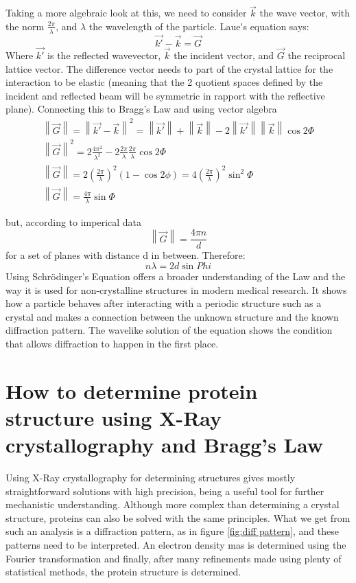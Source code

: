 \documentclass[14pt]{article}
\newcommand{\norm}[1]{\left\lVert#1\right\rVert}
\begin{document}
Taking a more algebraic look at this, we need to consider $\vec{k}$ the wave vector, with the norm $\frac{2\pi}{\lambda}$, and $\lambda$ the wavelength of the particle. \gls{Laue's equation} says: 
$$\vec{k'}-\vec{k}=\vec{G}$$
Where $\vec{k'}$ is the reflected wavevector, $\vec{k}$ the incident vector, and $\vec{G}$ the reciprocal lattice vector. The difference vector needs to part of the crystal lattice for the interaction to be elastic (meaning that the 2 quotient spaces defined by the incident and reflected beam will be symmetric in rapport with the reflective plane). Connecting this to Bragg’s Law and using vector algebra 
\begin{gather*}
    \norm{\vec{G}}=\norm{\vec{k'}-\vec{k}}^2=\norm{\vec{k'}}+\norm{\vec{k}}-2\norm{\vec{k'}}\norm{\vec{k}}\cos{2\Phi} \\
    \norm{\vec{G}}^2=2\frac{4\pi^2}{\lambda^2}-2\frac{2\pi}{\lambda}\frac{2\pi}{\lambda}\cos{2\Phi}\\
    \norm{\vec{G}}=2\left(\frac{2\pi}{\lambda}\right)^2(1-\cos{2\phi})=4\left(\frac{2\pi}{\lambda}\right)^2\sin^2{\Phi}\\
    \norm{\vec{G}}=\frac{4\pi}{\lambda}\sin{\Phi}
\end{gather*}

but, according to imperical data\cite{lattice}
$$\norm{\vec{G}}=\frac{4\pi n}{d}$$
for a set of planes with distance d in between. Therefore:
$$n\lambda=2d\sin{Phi}$$
Using Schrödinger's Equation offers a broader understanding of the Law and the way it is used for non-crystalline structures in modern medical research. It shows how a particle behaves after interacting with a periodic structure such as a crystal and makes a connection between the unknown structure and the known diffraction pattern. The wavelike solution of the equation shows the condition that allows diffraction to happen in the first place.


\section{How to determine protein structure using X-Ray crystallography and Bragg's Law}

Using X-Ray crystallography for determining structures gives mostly straightforward solutions with high precision, being a useful tool for further mechanistic understanding. Although more complex than determining a crystal structure, proteins can also be solved with the same principles.
What we get from such an analysis is a diffraction pattern, as in figure \ref{fig:diff pattern}, and these patterns need to be interpreted. An electron density mas is determined using the Fourier transformation and finally, after many refinements made using plenty of statistical methods, the protein structure is determined.
\end{document}
